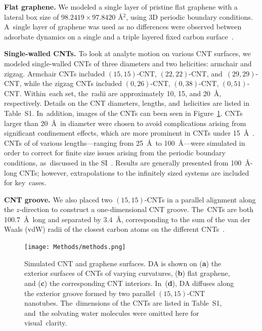 \documentclass[molecules,article,accept,pdftex,moreauthors]{Definitions/mdpi}
\begin{document}
{\bf{Flat graphene.}} %
 We modeled a single layer of pristine flat graphene with a lateral box size of $98.2419\times97.8420$ \AA$^2$, using 3D periodic boundary conditions. A~single layer of graphene was used as no differences were observed between adsorbate dynamics on a single and a triple layered fixed carbon surface~\cite{Jia2022}.

{\bf{Single-walled CNTs. }}
To look at analyte motion on various CNT surfaces, we modeled single-walled CNTs of three diameters and two helicities: armchair and zigzag. Armchair CNTs included $(15,15)$-CNT, $(22,22)$-CNT, and~$(29,29)$-CNT, while the zigzag CNTs included $(0,26)$-CNT, $(0,38)$-CNT, $(0,51)$-CNT. Within~each set, the~radii are approximately 10, 15, and 20~\AA, respectively. Details on the CNT diameters, lengths, and~helicities are listed in Table~S1. In~addition, images of the CNTs can been seen in Figure~\ref{fig:Methods_model_surfaces_CNTs}. %
 CNTs larger than 20~\AA\ in diameter were chosen to avoid complications arising from significant confinement effects, which are more prominent in CNTs under 15~\AA\ \cite{Alexiadis2008, Zheng2012}. CNTs of of various lengths---ranging from 25~\AA\ to 100~\AA\----were simulated in order to correct for finite size issues arising from the periodic boundary conditions, as~discussed in the SI~\cite{Yeh2004JPCB, Jamali2018JCTC, Fushiki2003PRE,Celebi2020,Jia2022}. Results are generally presented from 100~\AA-long CNTs; however, extrapolations to the infinitely sized systems are included for key~cases.

{\bf{CNT groove. }}
We also placed two $(15,15)$-CNTs in a parallel alignment along the $z$-direction to construct a one-dimensional CNT groove. The~CNTs are both 100.7~\AA\ long and separated by $3.4$~\AA, corresponding to the sum of the van der Waals (vdW) radii of the closest carbon atoms on the different CNTs~\cite{Lohrasebi2011PRE}. 

\begin{figure}[H]
    \texttt{[image: Methods/methods.png]}
    \caption{Simulated CNT and graphene surfaces. %
 DA is shown on (\textbf{a}) the exterior surfaces of CNTs of varying curvatures, (\textbf{b}) flat graphene, and (\textbf{c}) the corresponding CNT interiors. In~(\textbf{d}), DA diffuses along the exterior groove formed by two parallel $(15,15)$-CNT nanotubes. The~dimensions of the CNTs are listed in Table~S1, and~the solvating water molecules were omitted here for visual~clarity.}
    \label{fig:Methods_model_surfaces_CNTs}
\end{figure}
\end{document}
